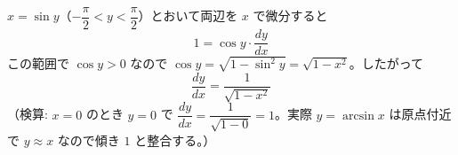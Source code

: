 
$x = \sin y$（$-\dfrac{\pi}{2} < y < \dfrac{\pi}{2}$）とおいて両辺を $x$ で微分すると
\[
1 = \cos y \cdot \frac{dy}{dx}
\]
この範囲で $\cos y > 0$ なので $\cos y = \sqrt{1-\sin^{2}y} = \sqrt{1-x^{2}}$。したがって
\[
\boxed{\; \frac{dy}{dx} = \frac{1}{\sqrt{1-x^{2}}} \;}
\]
（検算: $x=0$ のとき $y=0$ で $\dfrac{dy}{dx} = \dfrac{1}{\sqrt{1-0}} = 1$。実際 $y=\arcsin x$ は原点付近で $y \approx x$ なので傾き $1$ と整合する。）
